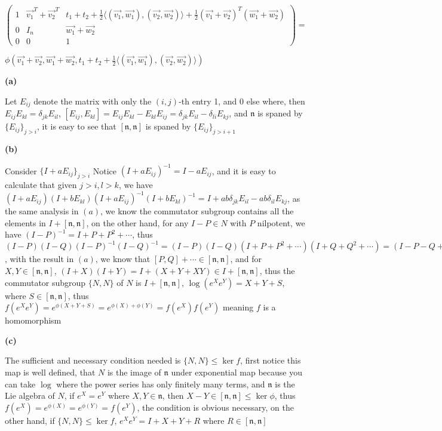 \documentclass[main]{subfiles}
\newcommand{\<}[1]{\langle #1 \rangle}
\begin{document}
$\left( {\begin{array}{ccc}
1 & \vec{v_1}^T+\vec{v_2}^T & t_1+t_2+\frac{1}{2}\<{(\vec{v_1},\vec{w_1}),(\vec{v_2},\vec{w_2})}+\frac{1}{2}(\vec{v_1}+\vec{v_2})^T(\vec{w_1}+\vec{w_2}) \\
0 & I_{n}& \vec{w_1}+\vec{w_2} \\
0 & 0 & 1
\end{array} } \right)=$\par
$\phi(\vec{v_1}+\vec{v_2},\vec{w_1}+\vec{w_2},t_1+t_2+\frac{1}{2}\<{(\vec{v_1},\vec{w_1}),(\vec{v_2},\vec{w_2})})$ \par


\begin{exercise}
\begin{enumerate}[label=(\alph*),leftmargin=*]

\end{enumerate}
\end{exercise}

\textbf{(a)} \par
Let $E_{ij}$ denote the matrix with only the $(i,j)$-th entry 1, and 0 else where, then $E_{ij}E_{kl}=\delta_{jk}E_{il}$, $[E_{ij},E_{kl}]=E_{ij}E_{kl}-E_{kl}E_{ij}=\delta_{jk}E_{il}-\delta_{li}E_{kj}$, and $\mathfrak{n}$ is spaned by $\{E_{ij}\}_{j>i}$, it is easy to see that $[\mathfrak{n},\mathfrak{n}]$ is spaned by $\{E_{ij}\}_{j>i+1}$ \par
\textbf{(b)} \par
Consider $\{I+aE_{ij}\}_{j>i}$ Notice $(I+aE_{ij})^{-1}=I-aE_{ij}$, and it is easy to calculate that given $j>i,l>k$, we have $(I+aE_{ij})(I+bE_{kl})(I+aE_{ij})^{-1}(I+bE_{kl})^{-1}=I+ab\delta_{jk}E_{il}-ab\delta_{il}E_{kj}$, as the same analysis in $(a)$, we know the commutator subgroup contains all the elements in $I+[\mathfrak{n},\mathfrak{n}]$, on the other hand, for any $I-P\in N$ with $P$ nilpotent, we have $(I-P)^{-1}=I+P+P^2+\cdots$, thus $(I-P)(I-Q)(I-P)^{-1}(I-Q)^{-1}=(I-P)(I-Q)(I+P+P^2+\cdots)(I+Q+Q^2+\cdots)=(I-P-Q+PQ)(I+P+Q+P^2+Q^2+PQ+\cdots)=I+[P,Q]+\cdots$, with the result in $(a)$, we know that $[P,Q]+\cdots\in [\mathfrak{n},\mathfrak{n}]$, and for $X,Y\in[\mathfrak{n},\mathfrak{n}]$, $(I+X)(I+Y)=I+(X+Y+XY)\in I+[\mathfrak{n},\mathfrak{n}]$, thus the commutator subgroup $\{N,N\}$ of $N$ is $I+[\mathfrak{n},\mathfrak{n}]$, $\log(e^Xe^Y)=X+Y+S$, where $S\in [\mathfrak{n},\mathfrak{n}]$, thus $f(e^Xe^Y)=e^{\phi(X+Y+S)}=e^{\phi(X)+\phi(Y)}=f(e^{X})f(e^Y)$ meaning $f$ is a homomorphism \par
\textbf{(c)} \par
The sufficient and necessary condition needed is $\{N,N\}\leq\ker f$, first notice this map is well defined, that $N$ is the image of $\mathfrak{n}$ under exponential map because you can take $\log$ where the power series has only finitely many terms, and $\mathfrak{n}$ is the Lie algebra of $N$, if $e^X=e^Y$ where $X,Y\in\mathfrak{n}$, then $X-Y\in [\mathfrak{n},\mathfrak{n}]\leq \ker \phi$, thus $f(e^X)=e^{\phi(X)}=e^{\phi(Y)}=f(e^Y)$, the condition is obvious necessary, on the other hand, if $\{N,N\}\leq\ker f$, $e^Xe^Y=I+X+Y+R$ where $R\in [\mathfrak{n},\mathfrak{n}]$ \par
\end{document}
